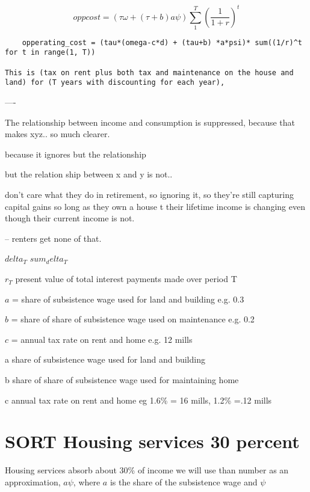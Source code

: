 \[ oppcost=  \left(\tau\omega  +(\tau+b)a\psi\right)\sum_1^T \left(\frac{1}{1+r}\right)^t\]

\begin{verbatim}
    opperating_cost = (tau*(omega-c*d) + (tau+b) *a*psi)* sum((1/r)^t for t in range(1, T))
    
This is (tax on rent plus both tax and maintenance on the house and land) for (T years with discounting for each year),
\end{verbatim}



----


The relationship between income and consumption is suppressed, because that makes xyz.. so much clearer.

because it ignores
but the relationship

but the relation ship between x and y is not..

don't care what they do in retirement, so ignoring it, so they're still capturing capital gains so long as they own a house
t
their lifetime income is changing even though their current income is not.

--
renters get none of that.



$delta_T$ 
$sum_delta_T$

$r_T$  present value of total interest payments made over period T




${a}$  =  share of subsistence wage  used for land and building e.g. 0.3

${b}$  = share of share of subsistence wage  used on maintenance e.g. 0.2

${c}$  = annual tax rate on rent and home  e.g. 12 mills 


a     share of subsistence wage  used for land and building

b      share of share of subsistence wage used for maintaining home

c    annual tax rate on rent and home  eg  1.6\% = 16 mills, 1.2\% =.12 mills






\section{SORT Housing services 30 percent}
Housing services absorb about 30\% of income  we will use than number  as an approximation,  $a\psi$, where $a$ is the share of the subsistence wage and $\psi$




